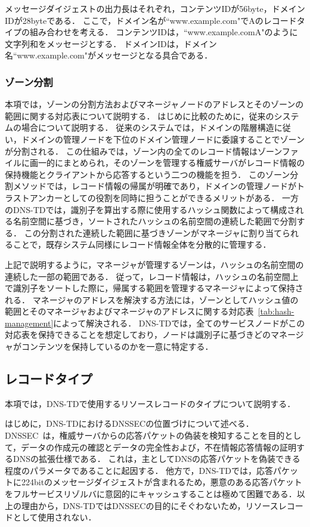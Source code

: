 メッセージダイジェストの出力長はそれぞれ，コンテンツIDが56byte，ドメインIDが28byteである．
ここで，ドメイン名が``www.example.com"でAのレコードタイプの組み合わせを考える．
コンテンツIDは，``www.example.comA"のように文字列和をメッセージとする．
ドメインIDは，ドメイン名``www.example.com"がメッセージとなる具合である．

\subsubsection{ゾーン分割}
本項では，ゾーンの分割方法およびマネージャノードのアドレスとそのゾーンの範囲に関する対応表について説明する．
はじめに比較のために，従来のシステムの場合について説明する．
従来のシステムでは，ドメインの階層構造に従い，ドメインの管理ノードを下位のドメイン管理ノードに委譲することでゾーンが分割される．
この仕組みでは，ゾーン内の全てのレコード情報はゾーンファイルに画一的にまとめられ，そのゾーンを管理する権威サーバがレコード情報の保持機能とクライアントから応答するという二つの機能を担う．
このゾーン分割メソッドでは，レコード情報の帰属が明確であり，ドメインの管理ノードがトラストアンカーとしての役割を同時に担うことができるメリットがある．
一方のDNS-TDでは，識別子を算出する際に使用するハッシュ関数によって構成される名前空間に基づき，ソートされたハッシュの名前空間の連続した範囲で分割する．
この分割された連続した範囲に基づきゾーンがマネージャに割り当てられることで，既存システム同様にレコード情報全体を分散的に管理する．

上記で説明するように，マネージャが管理するゾーンは，ハッシュの名前空間の連続した一部の範囲である．
従って，レコード情報は，ハッシュの名前空間上で識別子をソートした際に，帰属する範囲を管理するマネージャによって保持される．
マネージャのアドレスを解決する方法には，ゾーンとしてハッシュ値の範囲とそのマネージャおよびマネージャのアドレスに関する対応表~\ref{tab:hash-management}によって解決される．
DNS-TDでは，全てのサービスノードがこの対応表を保持できることを想定しており，ノードは識別子に基づきどのマネージャがコンテンツを保持しているのかを一意に特定する．


\newpage
\subsection{レコードタイプ}
本項では，DNS-TDで使用するリソースレコードのタイプについて説明する．

はじめに，DNS-TDにおけるDNSSECの位置づけについて述べる．
DNSSEC~\cite{rfc4033}は，権威サーバからの応答パケットの偽装を検知することを目的として，データの作成元の確認とデータの完全性および，不在情報応答情報の証明するDNSの拡張仕様である．
これは，主としてDNSの応答パケットを偽装できる程度のパラメータであることに起因する．
他方で，DNS-TDでは，応答パケットに224bitのメッセージダイジェストが含まれるため，悪意のある応答パケットをフルサービスリゾルバに意図的にキャッシュすることは極めて困難である．以上の理由から，DNS-TDではDNSSECの目的にそぐわないため，リソースレコードとして使用されない．

